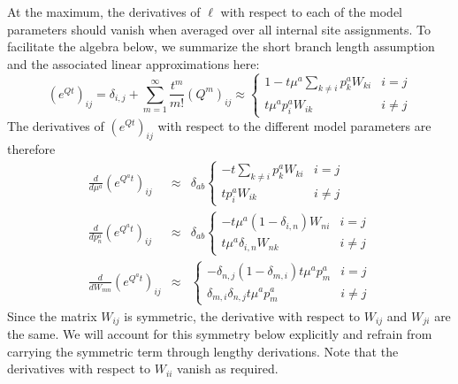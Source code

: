 \documentclass[aps,rmp,onecolumn]{revtex4}
\newcommand{\eqp}{p}
\newcommand{\lh}{\ell}
\begin{document}
At the maximum, the derivatives of $\lh$ with respect to each of the model parameters should vanish when averaged over all internal site assignments.
To facilitate the algebra below, we summarize the short branch length assumption and the associated linear approximations here:
\begin{equation}
	\left( e^{Q t}\right)_{ij} = \delta_{i,j} + \sum_{m=1}^\infty \frac{t^m}{m!}\left( Q^m\right)_{ij} \approx
	\begin{cases}
	1 - t\mu^a \sum_{k\neq i} \eqp_k^a W_{ki} & i=j \\
	t\mu^a \eqp^a_i W_{ik} & i\neq j
	\end{cases}
\end{equation}
The derivatives of $\left( e^{Q t}\right)_{ij}$ with respect to the different model parameters are therefore
\begin{eqnarray}
	\frac{d}{d\mu^a} \left( e^{Q^a t}\right)_{ij} &\approx & \delta_{ab}
	\begin{cases}
	-t\sum_{k\neq i} \eqp_k^a W_{ki} & i=j \\
	t \eqp^a_i W_{ik} & i\neq j
	\end{cases} \\
	\frac{d}{d\eqp_n^a} \left( e^{Q^a t}\right)_{ij} &\approx & \delta_{ab}
	\begin{cases}
	-t\mu^a (1-\delta_{i,n})W_{ni} & i=j \\
	 t\mu^a \delta_{i,n}W_{nk} & i\neq j
	\end{cases}\\
	\frac{d}{dW_{mn}} \left( e^{Q^a t}\right)_{ij} &\approx &
	\begin{cases}
	-\delta_{n,j}(1-\delta_{m,i})t \mu^a \eqp^a_m  & i=j \\
	 \delta_{m,i}\delta_{n,j} t\mu^a \eqp^a_m & i\neq j
	\end{cases}
\end{eqnarray}
Since the matrix $W_{ij}$ is symmetric, the derivative with respect to $W_{ij}$ and $W_{ji}$ are the same.
We will account for this symmetry below explicitly and refrain from carrying the symmetric term through lengthy derivations.
Note that the derivatives with respect to $W_{ii}$ vanish as required.
\end{document}
